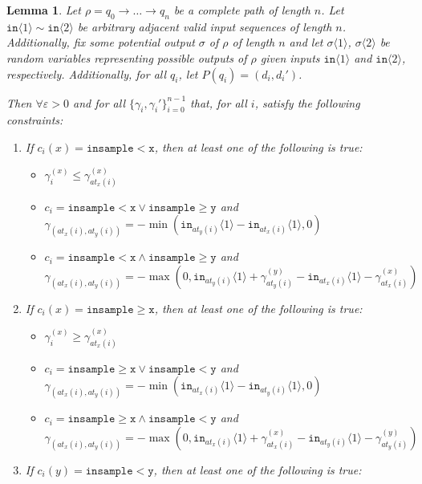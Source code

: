 \documentclass[12pt]{article}
\newcommand{\gguard}[1][x]{\texttt{insample}\geq#1}
\newcommand{\lguard}[1][x]{\texttt{insample} < #1}
\newcommand{\brangle}[1]{\langle#1 \rangle}
\newtheorem{lemma}[thm]{Lemma}
\theoremstyle{definition}
\begin{document}
\begin{lemma}
    Let $\rho = q_0\to \ldots \to q_n$ be a complete path of length $n$. 
    Let $\texttt{in}\brangle{1}\sim \texttt{in}\brangle{2}$ be arbitrary adjacent valid input sequences of length $n$. Additionally, fix some potential output $\sigma$ of $\rho$ of length $n$ and let $\sigma\brangle{1}$, $\sigma\brangle{2}$ be random variables representing possible outputs of $\rho$ given inputs $\texttt{in}\brangle{1}$ and $\texttt{in}\brangle{2}$, respectively. Additionally, for all $q_i$, let $P(q_i) = (d_i, d_i')$.

    Then $\forall \varepsilon>0$ and for all $\{\gamma_i, \gamma_i'\}_{i=0}^{n-1}$ that, for all $i$, satisfy the following constraints:\begin{enumerate}
        \item If $c_i(x) = \lguard[\texttt{x}]$, then at least one of the following is true: \begin{itemize}
            \item $\gamma_i^{(x)}\leq \gamma^{(x)}_{at_x(i)}$
            \item $c_i = \lguard[\texttt{x}]\lor\gguard[\texttt{y}]$ and $\gamma_{(at_x(i), at_y(i))} = -\min(\texttt{in}_{at_y(i)}\brangle{1}-\texttt{in}_{at_x(i)}\brangle{1}, 0)$
            \item $c_i = \lguard[\texttt{x}]\land\gguard[\texttt{y}]$ and $\gamma_{(at_x(i), at_y(i))} = -\max(0, \texttt{in}_{at_y(i)}\brangle{1}+ \gamma_{at_y(i)}^{(y)}-\texttt{in}_{at_x(i)}\brangle{1}-\gamma_{at_x(i)}^{(x)})$
        \end{itemize}
        \item If $c_i(x) = \gguard[\texttt{x}]$, then at least one of the following is true: \begin{itemize}
            \item $\gamma_i^{(x)}\geq \gamma^{(x)}_{at_x(i)}$
            \item $c_i = \gguard[\texttt{x}]\lor\lguard[\texttt{y}]$ and $\gamma_{(at_x(i), at_y(i))} = -\min(\texttt{in}_{at_x(i)}\brangle{1}-\texttt{in}_{at_y(i)}\brangle{1}, 0)$
            \item $c_i = \gguard[\texttt{x}]\land\lguard[\texttt{y}]$ and $\gamma_{(at_x(i), at_y(i))} = -\max(0, \texttt{in}_{at_x(i)}\brangle{1}+ \gamma_{at_x(i)}^{(x)}-\texttt{in}_{at_y(i)}\brangle{1}-\gamma_{at_y(i)}^{(y)})$
        \end{itemize}
        \item If $c_i(y) = \lguard[\texttt{y}]$, then at least one of the following is true: \begin{itemize}

\end{itemize}
\end{enumerate}
\end{lemma}
\end{document}
